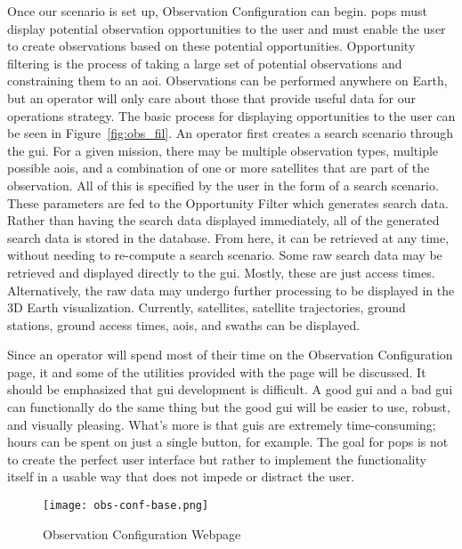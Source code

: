 Once our scenario is set up, Observation Configuration can begin. \gls{pops}
must display potential observation opportunities to the user and must enable
the user to create observations based on these potential opportunities.
Opportunity filtering is the process of taking a large set of potential
observations and constraining them to an \gls{aoi}. Observations can be
performed anywhere on Earth, but an operator will only care about those that
provide useful data for our operations strategy.  The basic process for
displaying opportunities to the user can be seen in Figure~\ref{fig:obs_fil}.
An operator first creates a search scenario through the \gls{gui}.  For a given
mission, there may be multiple observation types, multiple possible
\glspl{aoi}, and a combination of one or more satellites that are part of the
observation. All of this is specified by the user in the form of a search
scenario. These parameters are fed to the Opportunity Filter which generates
search data.  Rather than having the search data displayed immediately, all of
the generated search data is stored in the database. From here, it can be
retrieved at any time, without needing to re-compute a search scenario. Some
raw search data may be retrieved and displayed directly to the \gls{gui}.
Mostly, these are just access times.  Alternatively, the raw data may undergo
further processing to be displayed in the 3D Earth visualization. Currently,
satellites, satellite trajectories, ground stations, ground access times,
\glspl{aoi}, and swaths can be displayed.


Since an operator will spend most of their time on the Observation
Configuration page, it and some of the utilities provided with the page will be
discussed.  It should be emphasized that \gls{gui}  development is difficult.
A good \gls{gui} and a bad \gls{gui} can functionally do the same thing but the
good \gls{gui} will be easier to use, robust, and visually pleasing. What's
more is that \glspl{gui} are extremely time-consuming; hours can be spent on
just a single button, for example. The goal for \gls{pops} is not to create the
perfect user interface but rather to implement the functionality itself in a
usable way that does not impede or distract the user.

\begin{figure}
    \centering
    \texttt{[image: obs-conf-base.png]} 
    \caption{Observation Configuration Webpage}
    \label{fig:obs-conf-base} 
\end{figure}


